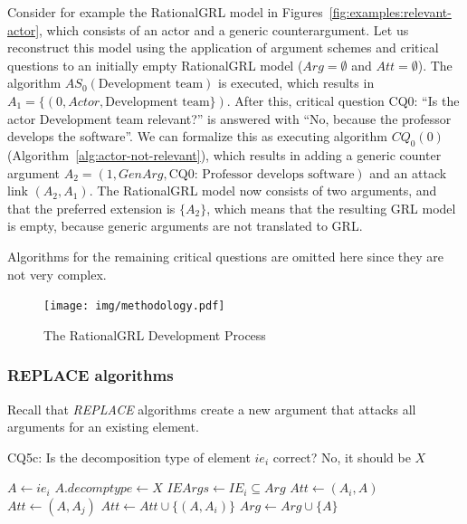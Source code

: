 Consider for example the RationalGRL model in Figures~\ref{fig:examples:relevant-actor}, which consists of an actor and a generic counterargument. Let us reconstruct this model using the application of argument schemes and critical questions to an initially empty RationalGRL model ($Arg=\emptyset$ and $Att=\emptyset$). The algorithm $AS_0(\text{Development team})$ is executed, which results in $A_1=\{(0,Actor,\text{Development team}\})$. After this, critical question CQ0: ``Is the actor Development team relevant?'' is answered with ``No, because the professor develops the software''. We can formalize this as executing algorithm $CQ_0(0)$ (Algorithm~\ref{alg:actor-not-relevant}), which results in adding a generic counter argument $A_2=(1, GenArg, \text{CQ0: Professor develops software})$ and an attack link $(A_2,A_1)$. The RationalGRL model now consists of two arguments, and that the preferred extension is $\{A_2\}$, which means that the resulting GRL model is empty, because generic arguments are not translated to GRL.

Algorithms for the remaining critical questions are omitted here since they are not very complex. 

\begin{figure}[b]
\centering
\texttt{[image: img/methodology.pdf]}
\caption{The RationalGRL Development Process}
\label{fig:rationalgrl-methodology}
\end{figure}

\subsubsection{REPLACE algorithms}
\label{sect:formalframework:replace}

Recall that \emph{REPLACE} algorithms create a new argument that attacks all arguments for an existing element.

\begin{algorithm}[h]
  \caption{CQ5c: Is the decomposition type of element $ie_i$ correct? No, it should be $X$ }\label{alg:replace1}
  \begin{algorithmic}[1]
    \State $A \leftarrow ie_i$\label{alg:replace1:arg}
    \State $A.decomptype\leftarrow X$\label{alg:replace1:decompchange}
    \State $IEArgs\leftarrow IE_i\subseteq  Arg$\label{alg:replace1:ieargs}
    \label{alg:replace1:for1}
      \State $Att\leftarrow (A_i,A)$
    \EndFor
    \label{alg:replace1:for2}
      \State $Att\leftarrow (A,A_j)$
    \label{alg:replace1:for3}
      \State $Att \leftarrow Att \cup \{(A,A_i)\}$\label{alg:replace1:att}
    \EndFor
    \EndFor
    \State $Arg\leftarrow Arg \cup \{A\}$\label{alg:replace1:addarg}
    \EndProcedure
  \end{algorithmic}
\end{algorithm}

